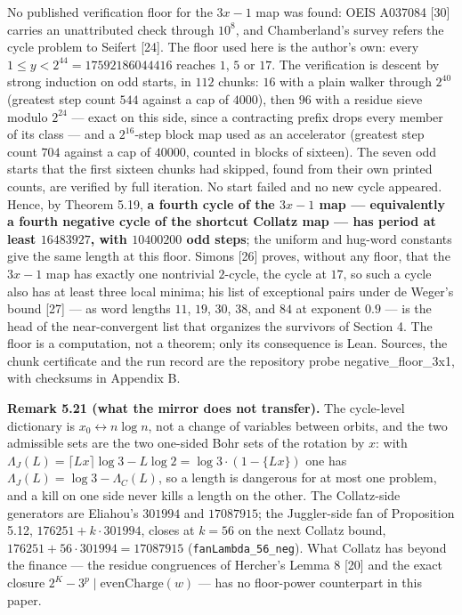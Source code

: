 \documentclass[12pt]{article}
\begin{document}
No published verification floor for the \(3x-1\) map was found: OEIS
A037084 {[}30{]} carries an unattributed check through \(10^8\), and
Chamberland's survey refers the cycle problem to Seifert {[}24{]}. The
floor used here is the author's own: every
\(1\le y<2^{44}=17592186044416\) reaches \(1\), \(5\) or \(17\). The
verification is descent by strong induction on odd starts, in \(112\)
chunks: \(16\) with a plain walker through \(2^{40}\) (greatest step
count \(544\) against a cap of \(4000\)), then \(96\) with a residue
sieve modulo \(2^{24}\) --- exact on this side, since a contracting
prefix drops every member of its class --- and a \(2^{16}\)-step block
map used as an accelerator (greatest step count \(704\) against a cap of
\(40000\), counted in blocks of sixteen). The seven odd starts that the
first sixteen chunks had skipped, found from their own printed counts,
are verified by full iteration. No start failed and no new cycle
appeared. Hence, by Theorem 5.19, \textbf{a fourth cycle of the \(3x-1\)
map --- equivalently a fourth negative cycle of the shortcut Collatz map
--- has period at least \(16483927\), with \(10400200\) odd steps}; the
uniform and hug-word constants give the same length at this floor.
Simons {[}26{]} proves, without any floor, that the \(3x-1\) map has
exactly one nontrivial \(2\)-cycle, the cycle at \(17\), so such a cycle
also has at least three local minima; his list of exceptional pairs
under de Weger's bound {[}27{]} --- as word lengths \(11\), \(19\),
\(30\), \(38\), and \(84\) at exponent \(0.9\) --- is the head of the
near-convergent list that organizes the survivors of Section 4. The
floor is a computation, not a theorem; only its consequence is Lean.
Sources, the chunk certificate and the run record are the repository
probe negative\_floor\_3x1, with checksums in Appendix B.

\textbf{Remark 5.21 (what the mirror does not transfer).} The
cycle-level dictionary is \(x_0\leftrightarrow n\log n\), not a change
of variables between orbits, and the two admissible sets are the two
one-sided Bohr sets of the rotation by \(x\): with
\(\Lambda_J(L)=\lceil Lx\rceil\log3-L\log2=\log3\cdot(1-\{Lx\})\) one
has \(\Lambda_J(L)=\log3-\Lambda_C(L)\), so a length is dangerous for at
most one problem, and a kill on one side never kills a length on the
other. The Collatz-side generators are Eliahou's \(301994\) and
\(17087915\); the Juggler-side fan of Proposition 5.12,
\(176251+k\cdot301994\), closes at \(k=56\) on the next Collatz bound,
\(176251+56\cdot301994=17087915\)
(\texttt{\nolinkurl{fanLambda_56_neg}}). What Collatz has beyond the
finance --- the residue congruences of Hercher's Lemma 8 {[}20{]} and
the exact closure \(2^K-3^p\mid\mathrm{evenCharge}(w)\) --- has no
floor-power counterpart in this paper.
\end{document}

